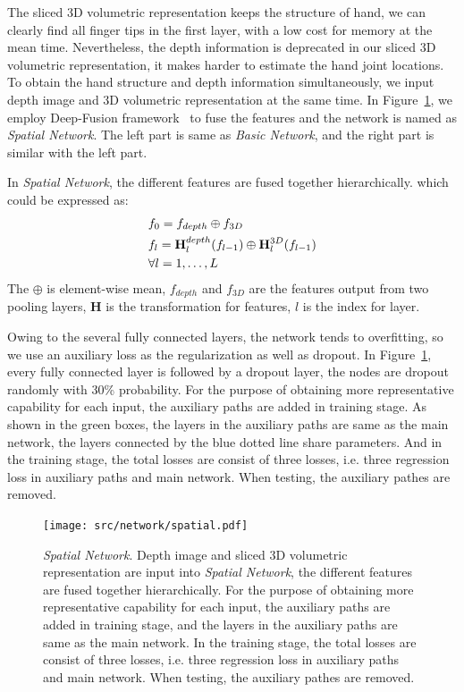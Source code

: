 \documentclass[journal,comsoc]{IEEEtran}
\let\MYoriglatexcaption\caption
\renewcommand{\caption}[2][\relax]{\MYoriglatexcaption[#2]{#2}}
\begin{document}
The sliced 3D volumetric representation keeps the structure of hand, we can clearly find all
finger tips in the first layer, with a low cost for memory at the mean time. Nevertheless,
the depth information is deprecated in our sliced 3D volumetric representation, it makes harder
to estimate the hand joint locations. To obtain the hand structure and depth
information simultaneously, we input depth image and 3D volumetric representation at the
same time. In Figure~\ref{fig:spatial network}, we employ Deep-Fusion
framework~\cite{Chen_2017_CVPR} to fuse the features and the network is named as \emph{Spatial Network}.
The left part is same as \emph{Basic Network}, and the right part is similar with the left part.

In \emph{Spatial Network}, the different features are fused together hierarchically.
which could be expressed as:
\begin{equation}\label{eq:deep fusion}
\begin{aligned}
&f_0 = f_{depth} \oplus f_{3D} \\
&f_l = \mathbf{H}_l^{depth}(f_{l-1}) \oplus \mathbf{H}_l^{3D}(f_{l-1}) \\
&\forall l=1, \dots , L
\vspace{1em}
\end{aligned}
\end{equation}
The $\oplus$ is element-wise mean, $f_{depth}$ and $f_{3D}$ are the features output from
two pooling layers, $\mathbf{H}$ is the transformation for features,
$l$ is the index for layer.

Owing to the several fully connected layers, the network tends to overfitting, so we use
an auxiliary loss as the regularization as well as dropout. In Figure~\ref{fig:spatial network},
every fully connected layer is followed by a dropout layer, the nodes are dropout randomly
with 30\% probability. For the purpose of obtaining more representative capability for each input,
the auxiliary paths are added in training stage. As shown in the green boxes, the layers in the
auxiliary paths are same as the main network, the layers connected by the blue dotted line
share parameters. And in the training stage, the total losses are consist of three losses,
i.e. three regression loss in auxiliary paths and main network. When testing, the auxiliary
pathes are removed.
\begin{figure}[t]
    \centering
    \texttt{[image: src/network/spatial.pdf]}
    \caption{\emph{Spatial Network}. Depth image and sliced 3D volumetric representation are input
    into \emph{Spatial Network}, the different features are fused together hierarchically. For the
    purpose of obtaining more representative capability for each input, the auxiliary paths are added
    in training stage, and the layers in the auxiliary paths are same as the main network. In the training
    stage, the total losses are consist of three losses, i.e. three regression loss in auxiliary paths
    and main network. When testing, the auxiliary pathes are removed.}
\label{fig:spatial network}
\end{figure}
\end{document}
